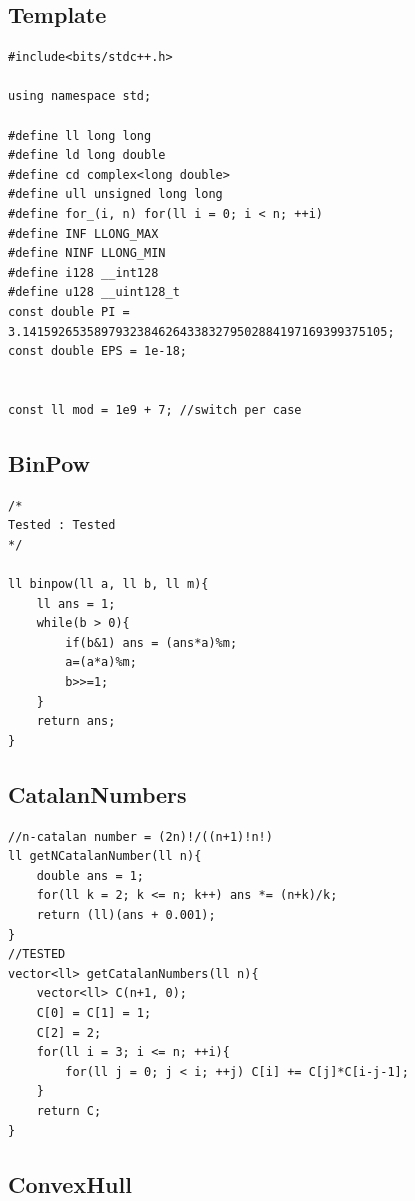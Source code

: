 \documentclass[10pt,a4paper,twocolumn]{article}
\begin{document}
	
	\subsection{Template}
	
	\begin{lstlisting}[style=cpp, title={template.cpp}]
#include<bits/stdc++.h>

using namespace std;

#define ll long long
#define ld long double
#define cd complex<long double>
#define ull unsigned long long
#define for_(i, n) for(ll i = 0; i < n; ++i)
#define INF LLONG_MAX
#define NINF LLONG_MIN
#define i128 __int128
#define u128 __uint128_t
const double PI = 3.141592653589793238462643383279502884197169399375105;
const double EPS = 1e-18;


const ll mod = 1e9 + 7; //switch per case
	\end{lstlisting}

	\subsection{BinPow}
	
	\begin{lstlisting}[style=cpp, title={BinPow.cpp}]
/*
Tested : Tested
*/

ll binpow(ll a, ll b, ll m){
    ll ans = 1;
    while(b > 0){
        if(b&1) ans = (ans*a)%m;
        a=(a*a)%m;
        b>>=1;
    }
    return ans;
}
	\end{lstlisting}
	
	\subsection{CatalanNumbers}
	
	\begin{lstlisting}[style=cpp, title={CatalanNumbers.cpp}]
//n-catalan number = (2n)!/((n+1)!n!)
ll getNCatalanNumber(ll n){
    double ans = 1;
    for(ll k = 2; k <= n; k++) ans *= (n+k)/k;
    return (ll)(ans + 0.001);
}
//TESTED
vector<ll> getCatalanNumbers(ll n){
    vector<ll> C(n+1, 0);
    C[0] = C[1] = 1;
    C[2] = 2;
    for(ll i = 3; i <= n; ++i){
        for(ll j = 0; j < i; ++j) C[i] += C[j]*C[i-j-1];
    }
    return C;
}
	\end{lstlisting}
	
	\subsection{ConvexHull}
	
\end{document}
